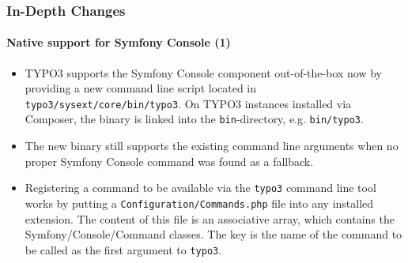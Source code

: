 \begin{frame}[fragile]
	\frametitle{In-Depth Changes}
	\framesubtitle{Native support for Symfony Console (1)}

	\lstset{basicstyle=\tiny\ttfamily}

	\begin{itemize}

		\item TYPO3 supports the Symfony Console component out-of-the-box now by providing
			a new command line script located in \texttt{typo3/sysext/core/bin/typo3}.
			On TYPO3 instances installed via Composer, the binary is linked into the
			\texttt{bin}-directory, e.g. \texttt{bin/typo3}.

		\item The new binary still supports the existing command line arguments when no
			proper Symfony Console command was found as a fallback.

		\item Registering a command to be available via the \texttt{typo3} command line
			tool works by putting a \texttt{Configuration/Commands.php} file into any
			installed extension. The content of this file is an associative array, which
			contains the Symfony/Console/Command classes. The key is the name of the
			command to be called as the first argument to \texttt{typo3}.
	\end{itemize}

\end{frame}

